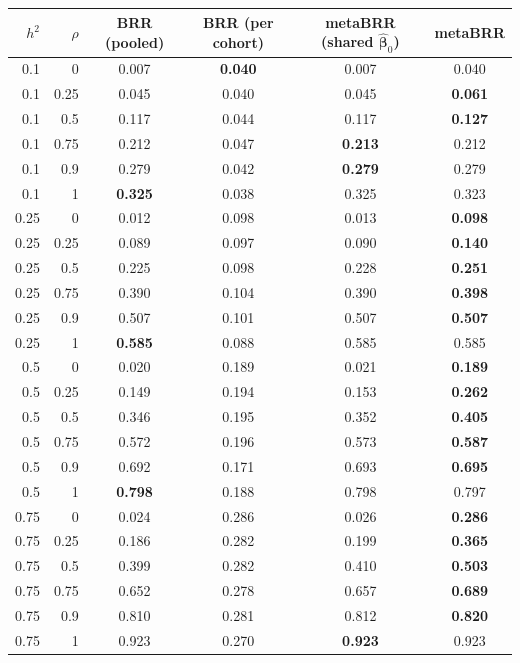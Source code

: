 \begin{tabular}{rrcccc}
\toprule
$h^2$ & $\rho$ & BRR (pooled) & BRR (per cohort) & metaBRR (shared $\hat{\bm\beta}_0$) & metaBRR \\
\midrule
0.1 & 0 & 0.007 & \textbf{0.040} & 0.007 & 0.040 \\
0.1 & 0.25 & 0.045 & 0.040 & 0.045 & \textbf{0.061} \\
0.1 & 0.5 & 0.117 & 0.044 & 0.117 & \textbf{0.127} \\
0.1 & 0.75 & 0.212 & 0.047 & \textbf{0.213} & 0.212 \\
0.1 & 0.9 & 0.279 & 0.042 & \textbf{0.279} & 0.279 \\
0.1 & 1 & \textbf{0.325} & 0.038 & 0.325 & 0.323 \\
0.25 & 0 & 0.012 & 0.098 & 0.013 & \textbf{0.098} \\
0.25 & 0.25 & 0.089 & 0.097 & 0.090 & \textbf{0.140} \\
0.25 & 0.5 & 0.225 & 0.098 & 0.228 & \textbf{0.251} \\
0.25 & 0.75 & 0.390 & 0.104 & 0.390 & \textbf{0.398} \\
0.25 & 0.9 & 0.507 & 0.101 & 0.507 & \textbf{0.507} \\
0.25 & 1 & \textbf{0.585} & 0.088 & 0.585 & 0.585 \\
0.5 & 0 & 0.020 & 0.189 & 0.021 & \textbf{0.189} \\
0.5 & 0.25 & 0.149 & 0.194 & 0.153 & \textbf{0.262} \\
0.5 & 0.5 & 0.346 & 0.195 & 0.352 & \textbf{0.405} \\
0.5 & 0.75 & 0.572 & 0.196 & 0.573 & \textbf{0.587} \\
0.5 & 0.9 & 0.692 & 0.171 & 0.693 & \textbf{0.695} \\
0.5 & 1 & \textbf{0.798} & 0.188 & 0.798 & 0.797 \\
0.75 & 0 & 0.024 & 0.286 & 0.026 & \textbf{0.286} \\
0.75 & 0.25 & 0.186 & 0.282 & 0.199 & \textbf{0.365} \\
0.75 & 0.5 & 0.399 & 0.282 & 0.410 & \textbf{0.503} \\
0.75 & 0.75 & 0.652 & 0.278 & 0.657 & \textbf{0.689} \\
0.75 & 0.9 & 0.810 & 0.281 & 0.812 & \textbf{0.820} \\
0.75 & 1 & 0.923 & 0.270 & \textbf{0.923} & 0.923 \\
\bottomrule
\end{tabular}
